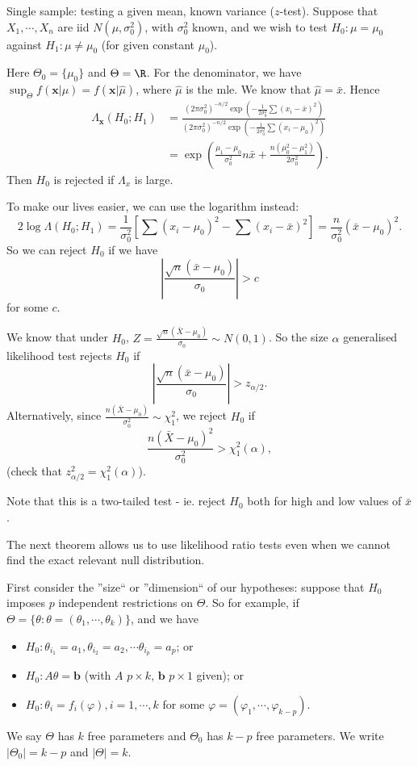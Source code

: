 \documentclass[a4paper]{article}
\begin{document}
\begin{eg}
  Single sample: testing a given mean, known variance ($z$-test). Suppose that $X_1, \cdots, X_n$ are iid $N(\mu, \sigma_0^2)$, with $\sigma_0^2$ known, and we wish to test $H_0: \mu = \mu_0$ against $H_1: \mu \not= \mu_0$ (for given constant $\mu_0$).

  Here $\Theta_0 = \{\mu_0\}$ and $\Theta = \R$.
  For the denominator, we have $\sup_\Theta f(\mathbf{x}|\mu) = f(\mathbf{x}|\hat{\mu})$, where $\hat{\mu}$ is the mle. We know that $\hat{\mu} = \bar x$. Hence
  \begin{align*}
    \Lambda_\mathbf{x}(H_0; H_1) &= \frac{(2\pi\sigma_0^2)^{-n/2}\exp\left(-\frac{1}{2\sigma^2_0}\sum(x_i - \bar x)^2\right)}{(2\pi\sigma_0^2)^{-n/2}\exp\left(-\frac{1}{2\sigma^2_0}\sum(x_i - \mu_0)^2\right)}\\
    &= \exp\left(\frac{\mu_1 - \mu_0}{\sigma_0^2}n\bar x + \frac{n(\mu_0^2 - \mu_1^2)}{2\sigma_0^2}\right).
  \end{align*}
  Then $H_0$ is rejected if $\Lambda_x$ is large.

  To make our lives easier, we can use the logarithm instead:
  \[
    2\log \Lambda(H_0;H_1) = \frac{1}{\sigma_0^2}\left[\sum (x_i - \mu_0)^2 - \sum (x_i - \bar x)^2\right] = \frac{n}{\sigma_0^2}(\bar x - \mu_0)^2.
  \]
  So we can reject $H_0$ if we have
  \[
    \left|\frac{\sqrt{n}(\bar x - \mu_0)}{\sigma_0}\right| > c
  \]
  for some $c$.

  We know that under $H_0$, $\displaystyle Z = \frac{\sqrt{n}(\bar X - \mu_0)}{\sigma_0}\sim N(0, 1)$. So the size $\alpha$ generalised likelihood test rejects $H_0$ if
  \[
    \left|\frac{\sqrt{n}(\bar x - \mu_0)}{\sigma_0}\right| > z_{\alpha/2}.
  \]
  Alternatively, since $\displaystyle \frac{n(\bar X - \mu_0)}{\sigma_0^2}\sim \chi_1^2$, we reject $H_0$ if
  \[
    \frac{n(\bar X - \mu_0)^2}{\sigma_0^2} > \chi_1^2(\alpha),
  \]
  (check that $z_{\alpha/2}^2 = \chi_1^2(\alpha)$).

  Note that this is a two-tailed test - ie. reject $H_0$ both for high and low values of $\bar x$.
\end{eg}

The next theorem allows us to use likelihood ratio tests even when we cannot find the exact relevant null distribution.

First consider the ''size`` or ''dimension`` of our hypotheses: suppose that $H_0$ imposes $p$ independent restrictions on $\Theta$. So for example, if $\Theta = \{\theta: \theta = (\theta_1, \cdots, \theta_k)\}$, and we have
\begin{itemize}
  \item $H_0: \theta_{i_1} = a_1, \theta_{i_2} = a_2, \cdots \theta_{i_p} = a_p$; or
  \item $H_0: A\theta = \mathbf{b}$ (with $A$ $p\times k$, $\mathbf{b}$ $p\times 1$ given); or
  \item $H_0: \theta_i = f_i(\varphi), i = 1, \cdots, k$ for some $\varphi = (\varphi_1, \cdots, \varphi_{k - p})$.
\end{itemize}
We say $\Theta$ has $k$ free parameters and $\Theta_0$ has $k - p$ free parameters. We write $|\Theta_0| = k - p$ and $|\Theta| = k$.
\end{document}
